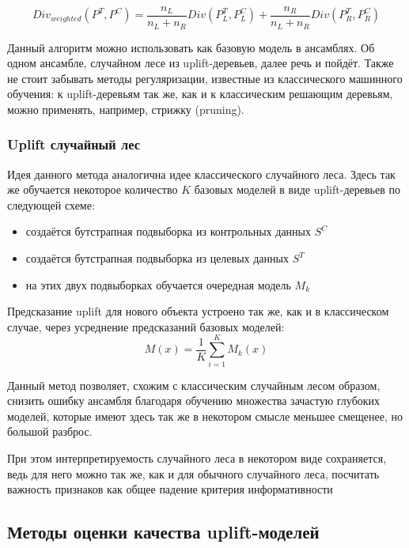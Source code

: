 $$
    Div_{weighted}(P^T, P^C) =
        \frac{n_L}{n_L + n_R}
        Div(P^T_L, P^C_L)
        +
        \frac{n_R}{n_L + n_R}
        Div(P^T_R, P^C_R)
$$

Данный алгоритм можно использовать как базовую модель в ансамблях. Об одном ансамбле, случайном лесе из uplift-деревьев, далее речь и пойдёт. Также не стоит забывать методы регуляризации, известные из классического машинного обучения: к uplift-деревьям так же, как и к классическим решающим деревьям, можно применять, например, стрижку (pruning).






\subsubsection*{Uplift случайный лес}

Идея данного метода аналогична идее классического случайного леса. Здесь так же обучается некоторое количество $K$ базовых моделей в виде uplift-деревьев по следующей схеме:
\begin{itemize}
    \item создаётся бутстрапная подвыборка из контрольных данных $S^C$
    \item создаётся бутстрапная подвыборка из целевых данных $S^T$
    \item на этих двух подвыборках обучается очередная модель $M_k$
\end{itemize}

Предсказание uplift для нового объекта устроено так же, как и в классическом случае, через усреднение предсказаний базовых моделей:
$$
    M(x) = \frac{1}{K} \sum\limits_{i=1}^{K} M_k(x)
$$

Данный метод позволяет, схожим с классическим случайным лесом образом, снизить ошибку ансамбля благодаря обучению множества зачастую глубоких моделей, которые имеют здесь так же в некотором смысле меньшее смещенее, но большой разброс.

При этом интерпретируемость случайного леса в некотором виде сохраняется, ведь для него можно так же, как и для обычного случайного леса, посчитать важность признаков как общее падение критерия информативности






\subsection{Методы оценки качества uplift-моделей}

